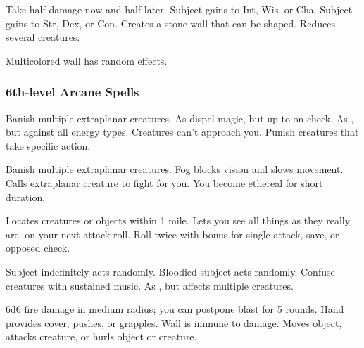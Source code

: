 \begin{swspelllist}
   Take half damage now and half later. 
   Subject gains  to Int, Wis, or Cha.
   Subject gains  to Str, Dex, or Con.
   Creates a stone wall that can be shaped.
   Reduces several creatures.

   Multicolored wall has random effects.
\end{swspelllist}

\subsubsection{6th-level Arcane Spells} 
\begin{swspelllist}
   Banish multiple extraplanar creatures. 
   As dispel magic, but up to  on check.
   As , but against all energy types.
   Creatures can't approach you.
   Punish creatures that take specific action.

   Banish multiple extraplanar creatures. 
   Fog blocks vision and slows movement.
   Calls extraplanar creature to fight for you.
   You become ethereal for short duration.

   Locates creatures or objects within 1 mile.
  \M Lets you see all things as they really are.
    on your next attack roll.
   Roll twice with bonus for single attack, save, or opposed check.

   Subject indefinitely acts randomly.
   Bloodied subject acts randomly.
   Confuse creatures with sustained music.
   As , but affects multiple creatures.

   6d6 fire damage in medium radius; you can postpone blast for 5 rounds.
   Hand provides cover, pushes, or grapples.
   Wall is immune to damage.
   Moves object, attacks creature, or hurls object or creature.


\end{swspelllist}
